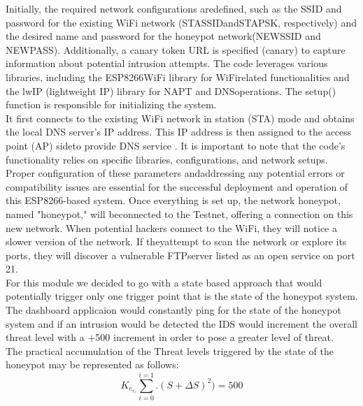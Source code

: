 \documentclass[letterpaper, 10 pt, conference]{ieeeconf}  %
\begin{document}


Initially, the required network configurations aredefined, such as the SSID and password for the existing WiFi network (STASSIDandSTAPSK, respectively) and the desired name and password for the honeypot network(NEWSSID and NEWPASS). Additionally, a canary token URL is specified (canary)
to capture information about potential intrusion attempts. The code leverages various libraries, including the ESP8266WiFi library for WiFirelated functionalities and the lwIP (lightweight IP) library for NAPT and DNSoperations. The setup() function is responsible for initializing the system.\cite{c6}\\ It first
connects to the existing WiFi network in station (STA) mode and obtains the local
DNS server's IP address. This IP address is then assigned to the access point (AP) sideto provide DNS service . It is important to note that the code's functionality relies on specific libraries, configurations, and network setups. Proper configuration of these parameters andaddressing any potential errors or compatibility issues are essential for the successful
deployment and operation of this ESP8266-based system. Once everything is set up, the network honeypot, named "honeypot," will beconnected to the Testnet, offering a connection on this new network. When potential
hackers connect to the WiFi, they will notice a slower version of the network. If theyattempt to scan the network or explore its ports, they will discover a vulnerable FTPserver listed as an open service on port 21.\cite{c6}\\
For this module we decided to go with a state based approach that would potentially trigger only one trigger point that is the state of the honeypot system. The dashboard applicaion would constantly ping for the state of the honeypot system and if an intrusion would be detected the IDS would increment the overall threat level with a +500 increment in order to pose a greater level of threat.\\
The practical accumulation of the Threat levels triggered by the state of the honeypot may be represented as follows:
\begin{equation}
K_e_r_r \sum_{i=0}^{i=1} . (S + \Delta S
)^2 ) = 500
\end{equation}
\end{document}
